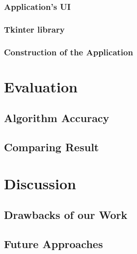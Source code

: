 \documentclass[12pt,oneside,a4paper,english]{article}
\begin{document}
\subsubsection{Application's UI}
\subsubsection{Tkinter library}
\subsubsection{Construction of the Application }
\newpage
\section{Evaluation}
\subsection{Algorithm Accuracy}
\subsection{Comparing Result}
\newpage
\section{Discussion}
\subsection{Drawbacks of our Work}
\subsection{Future Approaches}
\newpage
 
%  

\label{EndOfText}

\label{endOfDoc}
\end{document}
